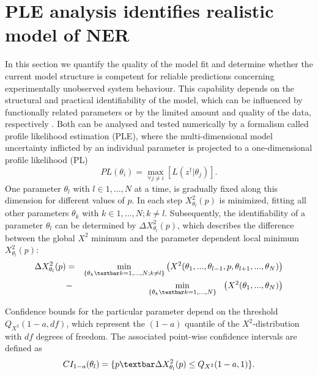 \section{PLE analysis identifies realistic model of NER}
\label{sec:identifiabilityAnalysis}
In this section we quantify the quality of the model fit and determine whether the current model structure is competent for reliable predictions concerning experimentally unobserved system behaviour. This capability depends on the structural and practical identifiability of the model, which can be influenced by functionally related parameters or by the limited amount and quality of the data, respectively \cite{Cobelli1980,Swameye2003}. Both can be analysed and tested numerically by a formalism called profile likelihood estimation (PLE)\cite{Venzon1988,Murphy2000,Raue2009}, where the multi-dimensional model uncertainty inflicted by an individual parameter is projected to a one-dimensional profile likelihood (PL)
\begin{equation}
PL(\theta_i) = \max_{\forall j \neq i} [L(z^\dag \lvert \theta_j)].
\label{eqn:PL} 
\end{equation}
One parameter $\theta_l$ with $l\in{1,...,N}$ at a time, is gradually fixed along this dimension for different values of $p$. In each step $X_{\theta_l}^2(p)$ is minimized, fitting all other parameters $\theta_k$ with $k\in{1,...,N};k\neq l$. Subsequently, the identifiability of a parameter $\theta_l$ can be determined by $\Delta X_{\theta_l}^2(p)$, which describes the difference between the global $X^2$ minimum and the parameter dependent local minimum $X_{\theta_l}^2(p)$:
\begin{eqnarray}
	\Delta X_{\theta_l}^2(p) &=& \min_{\{\theta_k\textbar k=1,...,N;k\neq l\}} \left( X^2 (\theta_1,...,\theta_{l-1},p,\theta_{l+1},...,\theta_N )\right)\nonumber \\
	&-& \quad \! \min_{\{\theta_k\textbar k=1,...,N\}} \quad \!\! \left( X^2 (\theta_1,...,\theta_N )\right)
\end{eqnarray}  

Confidence bounds for the particular parameter depend on the threshold $Q_{X^2}(1-a,df)$, which represent the $(1-a)$ quantile of the $X^2$-distribution with $df$ degrees of freedom. The associated point-wise confidence intervals are defined as
\begin{equation}
CI_{1-a}(\theta_l)= \{p\textbar \Delta X_{\theta_l}^2(p)\leq Q_{X^2}(1-a,1)\}.
\label{eqn:confidenceIntervals}
\end{equation} 

